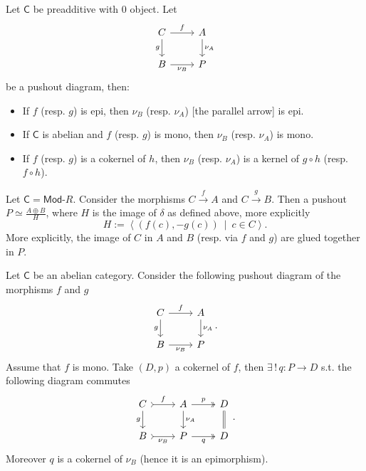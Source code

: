 \begin{prop}
	Let $\mathsf{C}$ be preadditive with $0$ object.
	Let 
	\begin{equation}
	\begin{tikzcd}
		C \arrow[r, "f", rightarrow] \arrow[d, "g"', rightarrow] &
		A \arrow[d, "\nu_A", rightarrow] \\
		B \arrow[r, "\nu_B"', rightarrow] & P
	\end{tikzcd}
	\end{equation} 
	be a pushout diagram, then:
	\begin{itemize}
		\item If $f$ (resp. $g$) is epi, then $\nu_B$ (resp. $\nu_A$) [the parallel arrow] is epi.
		\item If $\mathsf{C}$ is abelian and $f$ (resp. $g$) is mono, then $\nu_B$ (resp. $\nu_A$) is mono.
		\item If $f$ (resp. $g$) is a cokernel of $h$, then $\nu_B$ (resp. $\nu_A$) is a kernel of $g \circ h$ (resp. $f \circ h$).
	\end{itemize}
\end{prop} 

\begin{ex}
	Let $\mathsf{C} = \mathsf{Mod}\text{-}R$.
	Consider the morphisms $C \xrightarrow{f} A$ and $C \xrightarrow{g} B$.
	Then a pushout $P \simeq \frac{A \oplus B}{H}$, where $H$ is the image of $\delta$ as defined above, more explicitly
	\begin{equation}
		H := \left\langle \left(f(c), -g(c)\right) \ \middle|\ c \in C \right\rangle
	.\end{equation} 
	More explicitly, the image of $C$ in $A$ and $B$ (resp. via $f$ and $g$) are glued together in $P$.
\end{ex} 

\begin{ex}
	Let $\mathsf{C}$ be an abelian category.
	Consider the following pushout diagram of the morphisms $f$ and $g$ 
	\begin{equation}
	\begin{tikzcd}
		C \arrow[r, "f", rightarrow] \arrow[d, "g"', rightarrow] &
		A \arrow[d, "\nu_A", rightarrow] \\
		B \arrow[r, "\nu_B"', rightarrow] &
		P
	\end{tikzcd}
	.\end{equation} 
	Assume that $f$ is mono.
	Take $\left(D, p\right)$ a cokernel of $f$, then $\exists\, !\, q: P \to D$ s.t. the following diagram commutes
	\begin{equation}
	\begin{tikzcd}
		C \arrow[r, "f", tail] \arrow[d, "g"', rightarrow] &
		A \arrow[r, "p", twoheadrightarrow] \arrow[d, "\nu_A", rightarrow] &
		D \arrow[d, "", equal] \\
		B \arrow[r, "\nu_B"', tail] &
		P \arrow[r, "q"', twoheadrightarrow] &
		D
	\end{tikzcd}
	.\end{equation} 
	Moreover $q$ is a cokernel of $\nu_B$ (hence it is an epimorphism).
\end{ex} 
